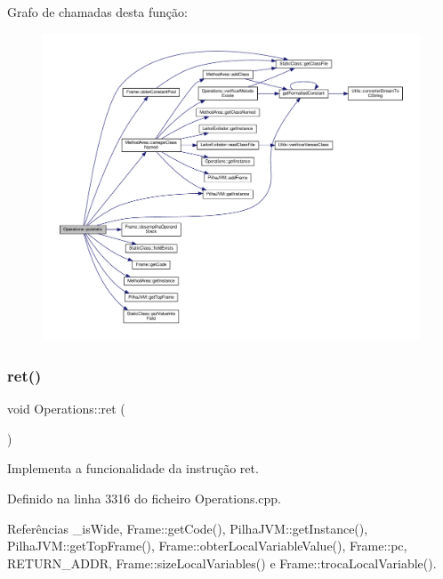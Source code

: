 Grafo de chamadas desta função\+:
\nopagebreak
\begin{figure}[H]
\begin{center}
\leavevmode
\includegraphics[width=350pt]{classOperations_ac6791ccfd8adf30d8f80b1f679f0b146_cgraph}
\end{center}
\end{figure}
\mbox{\label{classOperations_a3e7225adafc030be5d6e1c2b0a963a9b}} 
\subsubsection{\texorpdfstring{ret()}{ret()}}
{\footnotesize\ttfamily void Operations\+::ret (\begin{DoxyParamCaption}{ }\end{DoxyParamCaption})\hspace{0.3cm}{\ttfamily [private]}}



Implementa a funcionalidade da instrução ret. 



Definido na linha 3316 do ficheiro Operations.\+cpp.



Referências \+\_\+is\+Wide, Frame\+::get\+Code(), Pilha\+J\+V\+M\+::get\+Instance(), Pilha\+J\+V\+M\+::get\+Top\+Frame(), Frame\+::obter\+Local\+Variable\+Value(), Frame\+::pc, R\+E\+T\+U\+R\+N\+\_\+\+A\+D\+DR, Frame\+::size\+Local\+Variables() e Frame\+::troca\+Local\+Variable().



